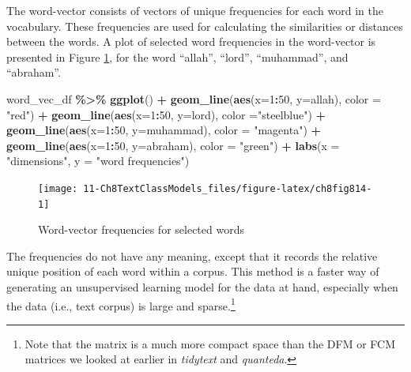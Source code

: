 \documentclass[
]{article}
\newenvironment{Shaded}{\begin{snugshade}}{\end{snugshade}}
\newcommand{\AttributeTok}[1]{\textcolor[rgb]{0.13,0.29,0.53}{#1}}
\newcommand{\DecValTok}[1]{\textcolor[rgb]{0.00,0.00,0.81}{#1}}
\newcommand{\FunctionTok}[1]{\textcolor[rgb]{0.13,0.29,0.53}{\textbf{#1}}}
\newcommand{\NormalTok}[1]{#1}
\newcommand{\SpecialCharTok}[1]{\textcolor[rgb]{0.81,0.36,0.00}{\textbf{#1}}}
\newcommand{\StringTok}[1]{\textcolor[rgb]{0.31,0.60,0.02}{#1}}
\begin{document}
\normalsize

The word-vector consists of vectors of unique frequencies for each word in the vocabulary. These frequencies are used for calculating the similarities or distances between the words. A plot of selected word frequencies in the word-vector is presented in Figure \ref{fig:ch8fig814}, for the word ``allah'', ``lord'', ``muhammad'', and ``abraham''.

\begin{Shaded}
\begin{Highlighting}[]
\NormalTok{word\_vec\_df }\SpecialCharTok{\%\textgreater{}\%} \FunctionTok{ggplot}\NormalTok{() }\SpecialCharTok{+} \FunctionTok{geom\_line}\NormalTok{(}\FunctionTok{aes}\NormalTok{(}\AttributeTok{x=}\DecValTok{1}\SpecialCharTok{:}\DecValTok{50}\NormalTok{, }\AttributeTok{y=}\NormalTok{allah), }\AttributeTok{color =} \StringTok{"red"}\NormalTok{) }\SpecialCharTok{+}
                    \FunctionTok{geom\_line}\NormalTok{(}\FunctionTok{aes}\NormalTok{(}\AttributeTok{x=}\DecValTok{1}\SpecialCharTok{:}\DecValTok{50}\NormalTok{, }\AttributeTok{y=}\NormalTok{lord), }\AttributeTok{color =}\StringTok{"steelblue"}\NormalTok{) }\SpecialCharTok{+}
                    \FunctionTok{geom\_line}\NormalTok{(}\FunctionTok{aes}\NormalTok{(}\AttributeTok{x=}\DecValTok{1}\SpecialCharTok{:}\DecValTok{50}\NormalTok{, }\AttributeTok{y=}\NormalTok{muhammad), }\AttributeTok{color =} \StringTok{"magenta"}\NormalTok{) }\SpecialCharTok{+}
                    \FunctionTok{geom\_line}\NormalTok{(}\FunctionTok{aes}\NormalTok{(}\AttributeTok{x=}\DecValTok{1}\SpecialCharTok{:}\DecValTok{50}\NormalTok{, }\AttributeTok{y=}\NormalTok{abraham), }\AttributeTok{color =} \StringTok{"green"}\NormalTok{) }\SpecialCharTok{+}
                    \FunctionTok{labs}\NormalTok{(}\AttributeTok{x =} \StringTok{"dimensions"}\NormalTok{, }\AttributeTok{y =} \StringTok{"word frequencies"}\NormalTok{)}
\end{Highlighting}
\end{Shaded}

\begin{figure}

{\centering \texttt{[image: 11-Ch8TextClassModels\_files/figure-latex/ch8fig814-1]} 

}

\caption{Word-vector frequencies for selected words}\label{fig:ch8fig814}
\end{figure}

The frequencies do not have any meaning, except that it records the relative unique position of each word within a corpus. This method is a faster way of generating an unsupervised learning model for the data at hand, especially when the data (i.e., text corpus) is large and sparse.\footnote{Note that the matrix is a much more compact space than the DFM or FCM matrices we looked at earlier in \emph{tidytext} and \emph{quanteda}.}
\end{document}

